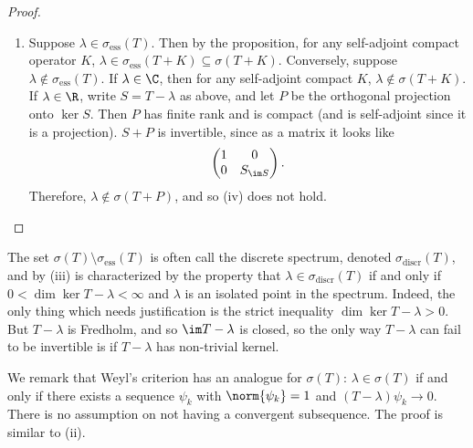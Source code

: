 \documentclass[12pt]{article}
\newcommand{\ess}{\sigma_{\text{ess}}}
\begin{document}
\begin{proof}
\begin{enumerate}[label = (\roman*)]
Set $S=T-\lambda$. If $\lambda \in \R$, Then $S$ is self-adjoint and Fredholm. We may picture $S$ as a $2\times 2$ matrix
\[\begin{pmatrix}0 & 0\\
0&S_{\im S}\end{pmatrix},\]
where we use the decomposition \[H = \ker S + \im S = \ker S + \ker S^\bot\]
to make sense of the matrix.
Since $\ker S = \im S^\bot$ by self-adjointness, $S-\mu$ looks like the matrix
\[\begin{pmatrix}-\mu & 0\\
0&S_{\im S}-\mu\end{pmatrix}.\]
Since $S|_{\im S} \to \im S$ is invertible, $S_{\im S} -\mu$ is invertible for small $\mu$, it is clear from looking at the matrix that this means that so is $S-\mu$. Thus $T-\lambda-\mu$ is invertible for $\mu$ small, i.e. $\lambda$, should it be in $\sigma(T)$, is an isolated point. This completes the proof that (iii) does not hold.
\item Suppose $\lambda \in \ess(T)$. Then by the proposition, for any self-adjoint compact operator $K$, $\lambda \in \ess(T+K) \subseteq \sigma(T+K)$. Conversely, suppose $\lambda \not \in \ess(T)$. If $\lambda \in \C$, then for any self-adjoint compact $K$, $\lambda \not \in \sigma(T+K)$. If $\lambda \in \R$, write $S = T-\lambda$ as above, and let $P$ be the orthogonal projection onto $\ker S$. Then $P$ has finite rank and is compact (and is self-adjoint since it is a projection). $S+P$ is invertible, since as a matrix it looks like
\[\begin{pmatrix}1 & 0\\
0&S_{\im S}\end{pmatrix}.\]
Therefore, $\lambda \not \in \sigma(T+P)$, and so (iv) does not hold.
\end{enumerate}
\end{proof}
\begin{rk}The set $\sigma(T)\setminus\ess(T)$ is often call the discrete spectrum, denoted $\sigma_{\text{discr}}(T)$, and by (iii) is characterized by the property that $\lambda \in \sigma_{\text{discr}}(T)$ if and only if $0 < \dim \ker T-\lambda < \infty$ and $\lambda$ is an isolated point in the spectrum. Indeed, the only thing which needs justification is the strict inequality $\dim \ker T-\lambda > 0$. But $T-\lambda$ is Fredholm, and so $\im T-\lambda$ is closed, so the only way $T-\lambda$ can fail to be invertible is if $T-\lambda$ has non-trivial kernel.\end{rk}
\begin{rk}We remark that Weyl's criterion has an analogue for $\sigma(T)$: $\lambda \in \sigma(T)$ if and only if there exists a sequence $\psi_k$ with $\norm{\psi_k} = 1$ and $(T-\lambda)\psi_k \to 0$. There is no assumption on not having a convergent subsequence. The proof is similar to (ii).\end{rk}
\end{document}
